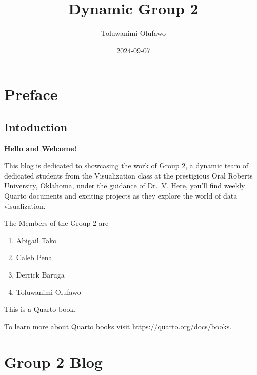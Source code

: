 \documentclass[
  letterpaper,
  DIV=11,
  numbers=noendperiod]{scrreprt}
\title{Dynamic Group 2}
\author{Toluwanimi Olufawo}
\date{2024-09-07}
\providecommand{\tightlist}{%
  \setlength{\itemsep}{0pt}\setlength{\parskip}{0pt}}\usepackage{longtable,booktabs,array}
\renewcommand*\contentsname{Table of contents}
\newcommand\contentsname{Table of contents}
\begin{document}
\maketitle

\renewcommand*\contentsname{Table of contents}
{
\hypersetup{linkcolor=}
\setcounter{tocdepth}{2}
\tableofcontents
}

\chapter*{Preface}\label{preface}


\section*{Intoduction}\label{intoduction}


\textbf{Hello and Welcome!}

This blog is dedicated to showcasing the work of Group 2, a dynamic team
of dedicated students from the Visualization class at the prestigious
Oral Roberts University, Oklahoma, under the guidance of Dr.~V. Here,
you'll find weekly Quarto documents and exciting projects as they
explore the world of data visualization.

The Members of the Group 2 are

\begin{enumerate}
\def\labelenumi{\arabic{enumi}.}
\tightlist
\item
  Abigail Tako
\item
  Caleb Pena
\item
  Derrick Baruga
\item
  Toluwanimi Olufawo
\end{enumerate}

This is a Quarto book.

To learn more about Quarto books visit
\url{https://quarto.org/docs/books}.


\chapter{Group 2 Blog}\label{group-2-blog}

\end{document}
